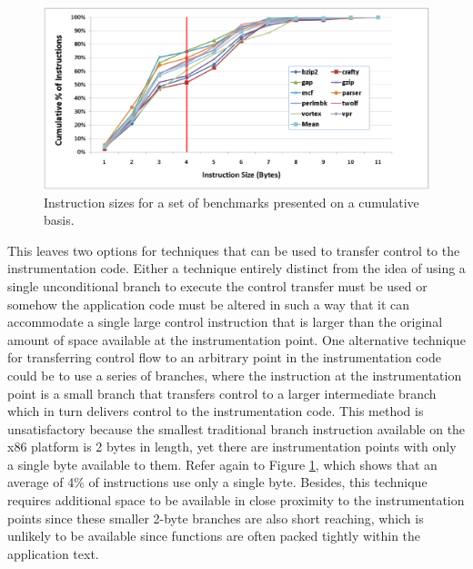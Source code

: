 \begin{figure}[ht]
\centering
\label{fig:InstructionSizes}
\includegraphics[scale=0.4]{instsize.eps}
\caption{Instruction sizes for a set of benchmarks presented on a cumulative basis.}
\end{figure}

This leaves two options for techniques that can be used to transfer control to
the instrumentation code. Either a technique entirely distinct from the idea of
using a single unconditional branch to execute the control transfer must be used
or somehow the application code must be altered in such a way that it can
accommodate a single large control instruction that is larger than the original
amount of space available at the instrumentation point. One alternative
technique for transferring control flow to an arbitrary point in the
instrumentation code could be to use a series of branches, where the instruction
at the instrumentation point is a small branch that transfers control to a
larger intermediate branch which in turn delivers control to the instrumentation
code. This method is unsatisfactory because the smallest traditional branch
instruction available on the x86 platform is 2 bytes in length, yet there are
instrumentation points with only a single byte available to them. Refer again to
Figure \ref{fig:InstructionSizes}, which shows that an average of 4\% of
instructions use only a single byte. Besides, this technique requires additional
space to be available in close proximity to the instrumentation points since
these smaller 2-byte branches are also short reaching, which is unlikely to be
available since functions are often packed tightly within the application text.

